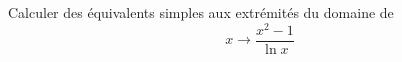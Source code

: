Calculer des \'{e}quivalents simples aux extr\'{e}mit\'{e}s du domaine de
\[x \rightarrow \frac{x^2-1}{\ln x}\]
\bigskip \bigskip \bigskip